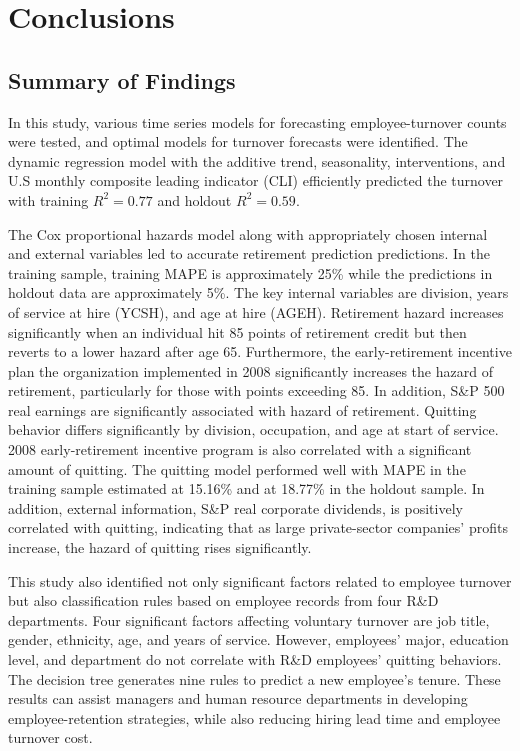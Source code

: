 \chapter{Conclusions} \label{ch:conclusion}
\section{Summary of Findings}
In this study, various time series models for forecasting employee-turnover counts were tested, and optimal models for turnover forecasts were identified. The dynamic regression model with the additive trend, seasonality, interventions, and U.S monthly composite leading indicator (CLI) efficiently predicted the turnover with training $R^2=0.77$ and holdout $R^2=0.59$. 

The Cox proportional hazards model along with appropriately chosen internal and external variables led to accurate retirement prediction predictions. In the training sample, training MAPE is approximately 25\% while the predictions in holdout data are approximately 5\%. The key internal variables are division, years of service at hire (YCSH), and age at hire (AGEH). Retirement hazard increases significantly when an individual hit 85 points of retirement credit but then reverts to a lower hazard after age 65. Furthermore, the early-retirement incentive plan the organization implemented in 2008 significantly increases the hazard of retirement, particularly for those with points exceeding 85. In addition, S\&P 500 real earnings are significantly associated with hazard of retirement. Quitting behavior differs significantly by division, occupation, and age at start of service. 2008 early-retirement incentive program is also correlated with a significant amount of quitting. The quitting model performed well with MAPE in the training sample estimated at 15.16\% and at 18.77\% in the holdout sample. In addition, external information, S\&P real corporate dividends, is positively correlated with quitting, indicating that as large private-sector companies' profits increase, the hazard of quitting rises significantly.

This study also identified not only significant factors related to employee turnover but also classification rules based on employee records from four R\&D departments. Four significant factors affecting voluntary turnover are job title, gender, ethnicity, age, and years of service. However, employees' major, education level, and department do not correlate with R\&D employees' quitting behaviors. The decision tree generates nine rules to predict a new employee's tenure. These results can assist managers and human resource departments in developing employee-retention strategies, while also reducing hiring lead time and employee turnover cost.  

